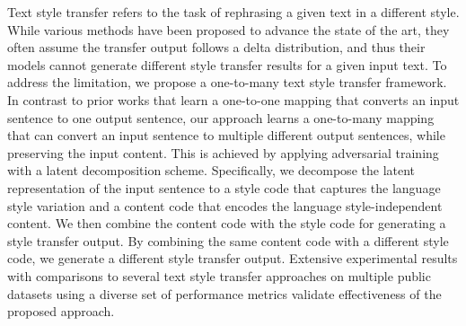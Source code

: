 Text style transfer refers to the task of rephrasing a given text in a different style. While various methods have been proposed to advance the state of the art, they often assume the transfer output follows a delta distribution, and thus their models cannot generate different style transfer results for a given input text. To address the limitation, we propose a one-to-many text style transfer framework. In contrast to prior works that learn a one-to-one mapping that converts an input sentence to one output sentence, our approach learns a one-to-many mapping that can convert an input sentence to multiple different output sentences, while preserving the input content. This is achieved by applying adversarial training with a latent decomposition scheme. Specifically, we decompose the latent representation of the input sentence to a style code that captures the language style variation and a content code that encodes the language style-independent content. We then combine the content code with the style code for generating a style transfer output. By combining the same content code with a different style code, we generate a different style transfer output. Extensive experimental results with comparisons to several text style transfer approaches on multiple public datasets using a diverse set of performance metrics validate effectiveness of the proposed approach.
